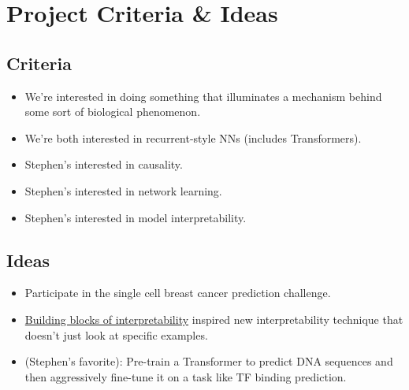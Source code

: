 \section{Project Criteria \& Ideas}
\subsection{Criteria}
\begin{itemize}
    \item We're interested in doing something that illuminates a mechanism behind some sort of biological phenomenon.
    \item We're both interested in recurrent-style NNs (includes Transformers).
    \item Stephen's interested in causality.
    \item Stephen's interested in network learning.
    \item Stephen's interested in model interpretability.
\end{itemize}

\subsection{Ideas}
\begin{itemize}
    \item Participate in the single cell breast cancer prediction challenge.
    \item \hyperlink{https://distill.pub/2018/building-blocks/}{Building blocks of interpretability} inspired new interpretability technique that doesn't just look at specific examples.
    \item (Stephen's favorite): Pre-train a Transformer to predict DNA sequences and then aggressively fine-tune it on a task like TF binding prediction.
\end{itemize}
